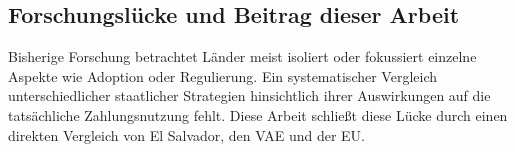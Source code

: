 \subsection{Forschungslücke und Beitrag dieser Arbeit}
\label{subsec:forschungsluecke}

Bisherige Forschung betrachtet Länder meist isoliert oder fokussiert einzelne Aspekte wie Adoption oder Regulierung. Ein systematischer Vergleich unterschiedlicher staatlicher Strategien hinsichtlich ihrer Auswirkungen auf die tatsächliche Zahlungsnutzung fehlt. Diese Arbeit schließt diese Lücke durch einen direkten Vergleich von El Salvador, den VAE und der EU.